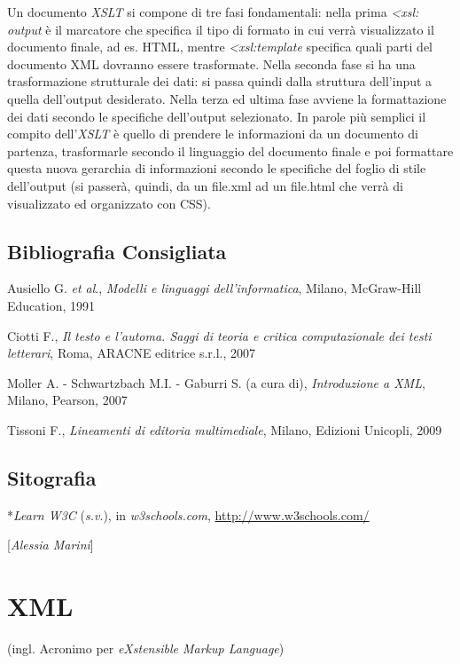 Un documento \emph{XSLT} si compone di tre fasi fondamentali: nella
prima \emph{\textless{}xsl: output} è il marcatore che
specifica il tipo di formato in cui verrà visualizzato il documento
finale, ad es. HTML, mentre \emph{\textless{}xsl:template}
specifica quali parti del documento XML dovranno essere trasformate.
Nella seconda fase si ha una trasformazione strutturale dei dati: si
passa quindi dalla struttura dell'input a quella dell'output desiderato.
Nella terza ed ultima fase avviene la formattazione dei dati secondo le
specifiche dell'output selezionato. In parole più semplici il compito
dell'\emph{XSLT} è quello di prendere le informazioni da un documento di
partenza, trasformarle secondo il linguaggio del documento finale e poi
formattare questa nuova gerarchia di informazioni secondo le specifiche
del foglio di stile dell'output (si passerà, quindi, da un file.xml ad
un file.html che verrà di visualizzato ed organizzato con CSS).

\section*{Bibliografia Consigliata}
{\parindent0pt 
Ausiello G. \emph{et al}., \emph{Modelli e linguaggi dell'informatica},
Milano, McGraw-Hill Education, 1991

Ciotti F., \emph{Il testo e l'automa. Saggi di teoria e critica
computazionale dei testi letterari}, Roma, ARACNE editrice s.r.l., 2007

Moller A. - Schwartzbach M.I. - Gaburri S. (a cura di),
\emph{Introduzione a XML}, Milano, Pearson, 2007

Tissoni F., \emph{Lineamenti di editoria multimediale}, Milano, Edizioni
Unicopli, 2009
}

\section*{Sitografia}
{\parindent0pt 
*\emph{Learn W3C} (\emph{s.v}.), in \emph{w3schools.com},
\url{http://www.w3schools.com/}
}

\hrulefill 
 
{[}\emph{Alessia Marini}{]}




\chapter{XML}

(ingl. Acronimo per \emph{eXstensible Markup Language})

